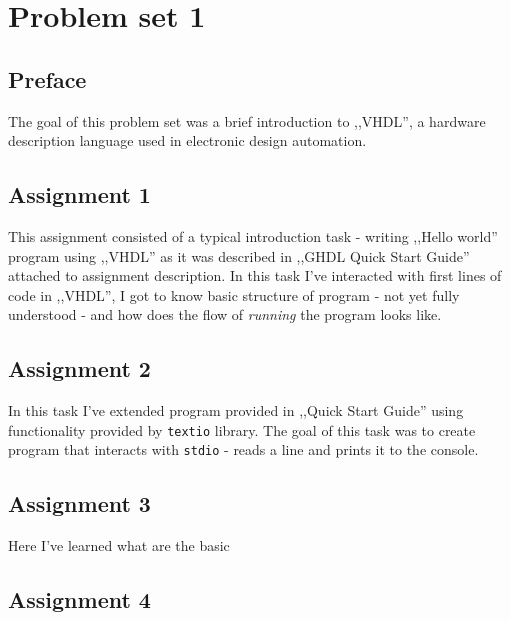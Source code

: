 \section{Problem set 1}
\subsection{Preface}

The goal of this problem set was a brief introduction to ,,VHDL'', a hardware
description language used in electronic design automation.

\subsection{Assignment 1}

This assignment consisted of a typical introduction task - writing
,,Hello world'' program using ,,VHDL'' as it was described in ,,GHDL Quick Start
Guide'' attached to assignment description. In this task I've interacted
with first lines of code in ,,VHDL'', I got to know basic structure of program
- not yet fully understood - and how does the flow of \textit{running} the
program looks like.

\subsection{Assignment 2}

In this task I've extended program provided in ,,Quick Start Guide'' using
functionality provided by \texttt{textio} library. The goal of this task was to
create program that interacts with \texttt{stdio} - reads a line and prints it
to the console.

\subsection{Assignment 3}

Here I've learned what are the basic

\subsection{Assignment 4}
